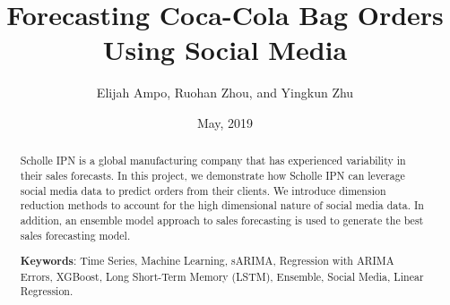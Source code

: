 \documentclass[12pt,oneside]{chicagocapstone}
\title{Forecasting Coca-Cola Bag Orders Using Social Media}
\author{Elijah Ampo, Ruohan Zhou, and Yingkun Zhu}
\date{May, 2019} %
\begin{document}
  \maketitle

\frontmatter %
\pagestyle{empty} %


  \begin{abstract}
    Scholle IPN is a global manufacturing company that has experienced variability in their sales forecasts. In this project, we demonstrate how Scholle IPN can leverage social media data to predict orders from their clients. We introduce dimension reduction methods to account for the high dimensional nature of social media data. In addition, an ensemble model approach to sales forecasting is used to generate the best sales forecasting model.
    
    \bigskip 
    \bigskip
    \bigskip
    
    \textbf{Keywords}: Time Series, Machine Learning, sARIMA, Regression with ARIMA Errors, XGBoost, Long Short-Term Memory (LSTM), Ensemble, Social Media, Linear Regression.
    
    \bigskip 
    \bigskip
    \bigskip
  \end{abstract}
\end{document}

